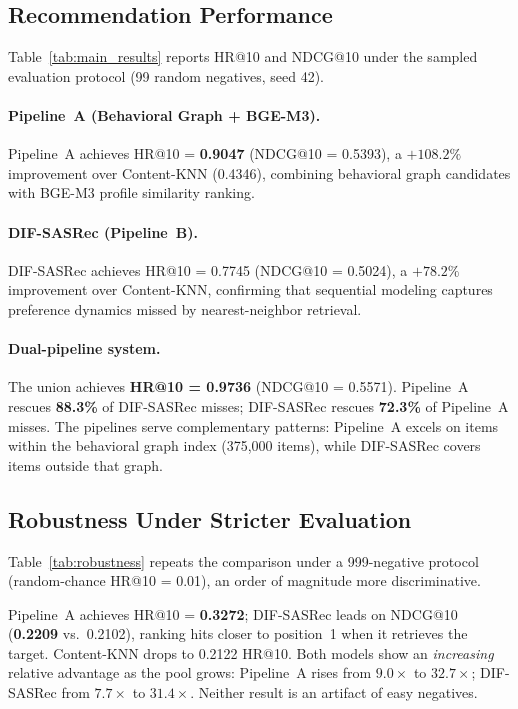 \subsection{Recommendation Performance}
Table~\ref{tab:main_results} reports HR@10 and NDCG@10 under the
sampled evaluation protocol (99 random negatives, seed 42).



\paragraph{Pipeline~A (Behavioral Graph + BGE-M3).}
Pipeline~A achieves HR@10 = \textbf{0.9047} (NDCG@10 = 0.5393), a
$+108.2\%$ improvement over Content-KNN (0.4346), combining behavioral
graph candidates with BGE-M3 profile similarity ranking.

\paragraph{DIF-SASRec (Pipeline~B).}
DIF-SASRec achieves HR@10 = 0.7745 (NDCG@10 = 0.5024), a $+78.2\%$
improvement over Content-KNN, confirming that sequential modeling captures
preference dynamics missed by nearest-neighbor retrieval.

\paragraph{Dual-pipeline system.}
The union achieves \textbf{HR@10 = 0.9736} (NDCG@10 = 0.5571).
Pipeline~A rescues \textbf{88.3\%} of DIF-SASRec misses; DIF-SASRec rescues
\textbf{72.3\%} of Pipeline~A misses.
The pipelines serve complementary patterns: Pipeline~A excels on items within
the behavioral graph index (375{,}000 items), while DIF-SASRec covers items outside that graph.



\subsection{Robustness Under Stricter Evaluation}
\label{ssec:robustness}

Table~\ref{tab:robustness} repeats the comparison under a 999-negative
protocol (random-chance HR@10 = 0.01), an order of magnitude more discriminative.



Pipeline~A achieves HR@10 = \textbf{0.3272}; DIF-SASRec leads on NDCG@10
(\textbf{0.2209} vs.\ 0.2102), ranking hits closer to position~1 when it
retrieves the target. Content-KNN drops to 0.2122 HR@10.
Both models show an \emph{increasing} relative advantage as the pool grows:
Pipeline~A rises from $9.0\times$ to $32.7\times$; DIF-SASRec from $7.7\times$
to $31.4\times$. Neither result is an artifact of easy negatives.


